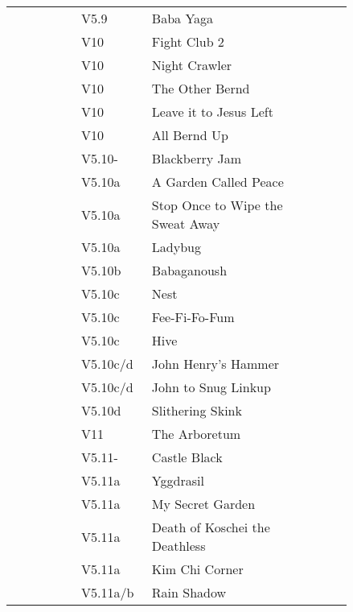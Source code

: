 \begin{flushleft}
\begin{center}
\begin{supertabular}{p{0.18\linewidth}p{0.13\linewidth}p{0.45\linewidth}p{0.08\linewidth}}
 &V5.9&Baba Yaga & \pageref{rt:Baba Yaga} \\
  &V10&Fight Club 2 & \pageref{rt:Fight Club 2} \\
  &V10&Night Crawler & \pageref{rt:Night Crawler} \\
&V10&The Other Bernd & \pageref{rt:The Other Bernd} \\
&V10&Leave it to Jesus Left & \pageref{vr:Leave it to Jesus Left} \\
&V10&All Bernd Up & \pageref{rt:All Bernd Up} \\
&V5.10-&Blackberry Jam & \pageref{rt:Blackberry Jam} \\
   &V5.10a&A Garden Called Peace & \pageref{rt:A Garden Called Peace} \\
 &V5.10a&Stop Once to Wipe the Sweat Away & \pageref{rt:Stop Once to Wipe the Sweat Away} \\
&V5.10a&Ladybug & \pageref{rt:Ladybug} \\
&V5.10b&Babaganoush & \pageref{rt:Babaganoush} \\
  &V5.10c&Nest & \pageref{rt:Nest} \\
  &V5.10c&Fee-Fi-Fo-Fum & \pageref{rt:Fee-Fi-Fo-Fum} \\
 &V5.10c&Hive & \pageref{rt:Hive} \\
  &V5.10c/d&John Henry's Hammer & \pageref{rt:John Henry's Hammer} \\
  &V5.10c/d&John to Snug Linkup & \pageref{vr:John to Snug Linkup} \\
   &V5.10d&Slithering Skink & \pageref{rt:Slithering Skink} \\
   &V11&The Arboretum & \pageref{rt:The Arboretum} \\
 &V5.11-&Castle Black & \pageref{rt:Castle Black} \\
   &V5.11a&Yggdrasil & \pageref{rt:Yggdrasil} \\
  &V5.11a&My Secret Garden & \pageref{rt:My Secret Garden} \\
 &V5.11a&Death of Koschei the Deathless & \pageref{rt:Death of Koschei the Deathless} \\
&V5.11a&Kim Chi Corner & \pageref{rt:Kim Chi Corner} \\
 &V5.11a/b&Rain Shadow & \pageref{rt:Rain Shadow} \\

\end{supertabular}
\end{center}
\end{flushleft}
